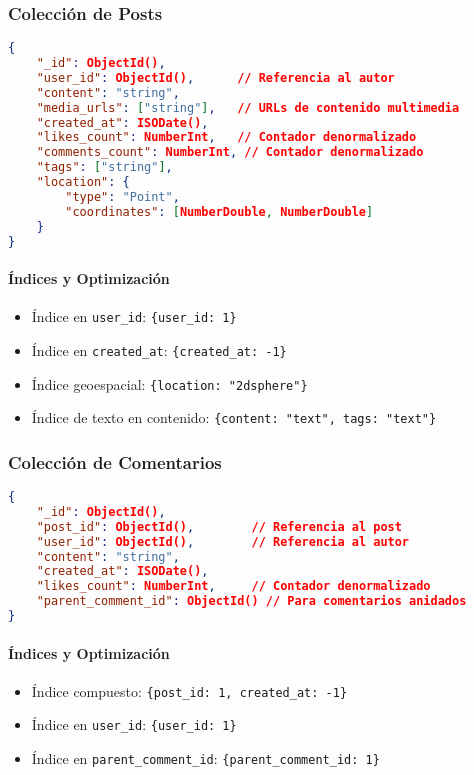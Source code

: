 \documentclass[12pt,letterpaper]{article}
\begin{document}
\subsubsection{Colección de Posts}
\begin{lstlisting}[language=json]
{
    "_id": ObjectId(),
    "user_id": ObjectId(),      // Referencia al autor
    "content": "string",
    "media_urls": ["string"],   // URLs de contenido multimedia
    "created_at": ISODate(),
    "likes_count": NumberInt,   // Contador denormalizado
    "comments_count": NumberInt, // Contador denormalizado
    "tags": ["string"],
    "location": {
        "type": "Point",
        "coordinates": [NumberDouble, NumberDouble]
    }
}
\end{lstlisting}

\paragraph{Índices y Optimización}
\begin{itemize}
    \item Índice en \texttt{user\_id}: \texttt{\{user\_id: 1\}}
    \item Índice en \texttt{created\_at}: \texttt{\{created\_at: -1\}}
    \item Índice geoespacial: \texttt{\{location: "2dsphere"\}}
    \item Índice de texto en contenido: \texttt{\{content: "text", tags: "text"\}}
\end{itemize}

\subsubsection{Colección de Comentarios}
\begin{lstlisting}[language=json]
{
    "_id": ObjectId(),
    "post_id": ObjectId(),        // Referencia al post
    "user_id": ObjectId(),        // Referencia al autor
    "content": "string",
    "created_at": ISODate(),
    "likes_count": NumberInt,     // Contador denormalizado
    "parent_comment_id": ObjectId() // Para comentarios anidados
}
\end{lstlisting}

\paragraph{Índices y Optimización}
\begin{itemize}
    \item Índice compuesto: \texttt{\{post\_id: 1, created\_at: -1\}}
    \item Índice en \texttt{user\_id}: \texttt{\{user\_id: 1\}}
    \item Índice en \texttt{parent\_comment\_id}: \texttt{\{parent\_comment\_id: 1\}}
\end{itemize}
\end{document}
